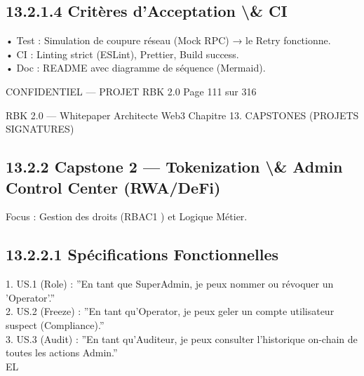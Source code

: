 \documentclass[12pt,landscape,a4paper]{article}
\newenvironment{confidential}
{\begin{tcolorbox}[
    colback=rbkred!5!white,
    colframe=rbkred!75!black,
    title=CONFIDENTIEL,
    fonttitle=\bfseries\color{white},
    coltitle=rbkred!75!black,
    breakable,
    enhanced,
    frame hidden,
    borderline west={2pt}{0pt}{rbkred!75!black}
]}
{\end{tcolorbox}}
\begin{document}
\subsection{13.2.1.4 Critères d’Acceptation \textbackslash{}& CI}
\vspace{0.5em}
• Test : Simulation de coupure réseau (Mock RPC) → le Retry fonctionne.\\
\vspace{0.5em}
• CI : Linting strict (ESLint), Prettier, Build success.\\
\vspace{0.5em}
• Doc : README avec diagramme de séquence (Mermaid).\\
\vspace{0.5em}
\vspace{0.5em}
\vspace{0.5em}
\begin{confidential}CONFIDENTIEL — PROJET RBK 2.0                                 Page 111 sur 316\end{confidential}
RBK 2.0 — Whitepaper Architecte Web3                                                                        Chapitre 13. CAPSTONES (PROJETS SIGNATURES)\\
\vspace{0.5em}
\vspace{0.5em}
\subsection{13.2.2 Capstone 2 — Tokenization \textbackslash{}& Admin Control Center (RWA/DeFi)}
\vspace{0.5em}
Focus : Gestion des droits (RBAC1 ) et Logique Métier.\\
\vspace{0.5em}
\subsection{13.2.2.1 Spécifications Fonctionnelles}
\vspace{0.5em}
1. US.1 (Role) : ”En tant que SuperAdmin, je peux nommer ou révoquer un ’Operator’.”\\
\vspace{0.5em}
2. US.2 (Freeze) : ”En tant qu’Operator, je peux geler un compte utilisateur suspect (Compliance).”\\
\vspace{0.5em}
3. US.3 (Audit) : ”En tant qu’Auditeur, je peux consulter l’historique on-chain de toutes les actions Admin.”\\
\vspace{0.5em}
\vspace{0.5em}
\vspace{0.5em}
\vspace{0.5em}
EL\\
\end{document}
